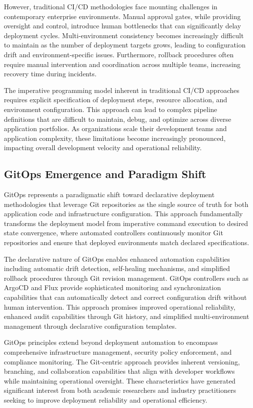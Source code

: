 However, traditional CI/CD methodologies face mounting challenges in contemporary enterprise environments. Manual approval gates, while providing oversight and control, introduce human bottlenecks that can significantly delay deployment cycles. Multi-environment consistency becomes increasingly difficult to maintain as the number of deployment targets grows, leading to configuration drift and environment-specific issues. Furthermore, rollback procedures often require manual intervention and coordination across multiple teams, increasing recovery time during incidents.

The imperative programming model inherent in traditional CI/CD approaches requires explicit specification of deployment steps, resource allocation, and environment configuration. This approach can lead to complex pipeline definitions that are difficult to maintain, debug, and optimize across diverse application portfolios. As organizations scale their development teams and application complexity, these limitations become increasingly pronounced, impacting overall development velocity and operational reliability.

\subsection{GitOps Emergence and Paradigm Shift}
GitOps represents a paradigmatic shift toward declarative deployment methodologies that leverage Git repositories as the single source of truth for both application code and infrastructure configuration. This approach fundamentally transforms the deployment model from imperative command execution to desired state convergence, where automated controllers continuously monitor Git repositories and ensure that deployed environments match declared specifications.

The declarative nature of GitOps enables enhanced automation capabilities including automatic drift detection, self-healing mechanisms, and simplified rollback procedures through Git revision management. GitOps controllers such as ArgoCD and Flux provide sophisticated monitoring and synchronization capabilities that can automatically detect and correct configuration drift without human intervention. This approach promises improved operational reliability, enhanced audit capabilities through Git history, and simplified multi-environment management through declarative configuration templates.

GitOps principles extend beyond deployment automation to encompass comprehensive infrastructure management, security policy enforcement, and compliance monitoring. The Git-centric approach provides inherent versioning, branching, and collaboration capabilities that align with developer workflows while maintaining operational oversight. These characteristics have generated significant interest from both academic researchers and industry practitioners seeking to improve deployment reliability and operational efficiency.

